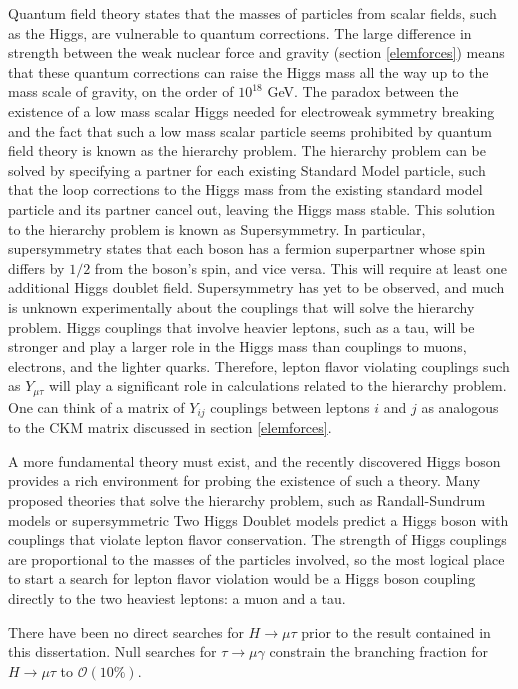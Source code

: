 \documentclass[oneside, letterpaper, oldfontcommands]{memoir}
\begin{document}
Quantum field theory states that the masses of particles from scalar fields, such as the Higgs, are vulnerable to quantum corrections. The large difference in strength between the weak nuclear force and gravity (section \ref{elemforces}) means that these quantum corrections can raise the Higgs mass all the way up to the mass scale of gravity, on the order of $10^{18}$ GeV. The paradox between the existence of a low mass scalar Higgs needed for electroweak symmetry breaking and the fact that such a low mass scalar particle seems prohibited by quantum field theory is known as the hierarchy problem. The hierarchy problem can be solved by specifying a partner for each existing Standard Model particle, such that the loop corrections to the Higgs mass from the existing standard model particle and its partner cancel out, leaving the Higgs mass stable. This solution to the hierarchy problem is known as Supersymmetry. In particular, supersymmetry states that each boson has a fermion superpartner whose spin differs by $1/2$ from the boson's spin, and vice versa. This will require at least one additional Higgs doublet field\cite{Csaki:1996ks}. Supersymmetry has yet to be observed, and much is unknown experimentally about the couplings that will solve the hierarchy problem. Higgs couplings that involve heavier leptons, such as a tau, will be stronger and play a larger role in the Higgs mass than couplings to muons, electrons, and the lighter quarks. Therefore, lepton flavor violating couplings such as  $Y_{\mu\tau}$ will play a significant role in calculations related to the hierarchy problem. One can think of a matrix of $Y_{ij}$ couplings between leptons $i$ and $j$ as analogous to the CKM matrix discussed in section \ref{elemforces}.

A more fundamental theory must exist, and the recently discovered Higgs boson provides a rich environment for probing the existence of such a theory. Many proposed theories that solve the hierarchy problem, such as Randall-Sundrum models \cite{Randall:1999ee} or supersymmetric Two Higgs Doublet models \cite{Branco:2011iw} 
predict a Higgs boson with couplings that violate lepton flavor conservation. The strength of Higgs couplings are proportional to the masses of the particles involved, so the most logical place to start a search for lepton flavor violation would be a Higgs boson coupling directly to the two heaviest leptons: a muon and a tau.

\qquad There have been no direct searches for $H \rightarrow \mu\tau$ prior to the result contained in this dissertation. Null searches for $\tau \rightarrow \mu\gamma$ constrain the branching fraction for $H \rightarrow \mu\tau$ to $\mathcal{O}(10\%)$.\cite{Harnik:2012pb}
\end{document}

